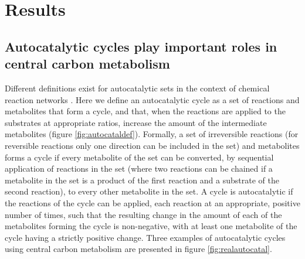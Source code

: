 \section{Results}
\subsection{Autocatalytic cycles play important roles in central carbon metabolism}
Different definitions exist for autocatalytic sets in the context of chemical reaction networks \cite{Hordijk2004-xe, Eigen2012-ti, Kun2008-xg}.
Here we define an autocatalytic cycle as a set of reactions and metabolites that form a cycle, and that, when the reactions are applied to the substrates at appropriate ratios, increase the amount of the intermediate metabolites (figure \ref{fig:autocataldef}).
Formally, a set of irreversible reactions (for reversible reactions only one direction can be included in the set) and metabolites forms a cycle if every metabolite of the set can be converted, by sequential application of reactions in the set (where two reactions can be chained if a metabolite in the set is a product of the first reaction and a substrate of the second reaction), to every other metabolite in the set.
A cycle is autocatalytic if the reactions of the cycle can be applied, each reaction at an appropriate, positive number of times, such that the resulting change in the amount of each of the metabolites forming the cycle is non-negative, with at least one metabolite of the cycle having a strictly positive change.
Three examples of autocatalytic cycles using central carbon metabolism are presented in figure \ref{fig:realautocatal}.

